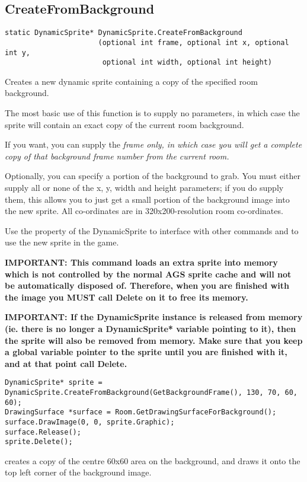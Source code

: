 \subsection{CreateFromBackground}\label{DynamicSprite.CreateFromBackground}%

\begin{verbatim}
static DynamicSprite* DynamicSprite.CreateFromBackground
                      (optional int frame, optional int x, optional int y,
                       optional int width, optional int height)
\end{verbatim}
Creates a new dynamic sprite containing a copy of the specified room background.

The most basic use of this function is to supply no parameters, in which case
the sprite will contain an exact copy of the current room background.

If you want, you can supply the \it{frame} only, in which case you will get a
complete copy of that background frame number from the current room.

Optionally, you can specify a portion of the background to grab. You must
either supply all or none of the x, y, width and height parameters; if you
do supply them, this allows you to just get a small portion of the background
image into the new sprite. All co-ordinates are in 320x200-resolution room co-ordinates.

Use the  property of the DynamicSprite to
interface with other commands and to use the new sprite in the game.

\bf{IMPORTANT:} This command loads an extra sprite into memory which is not controlled
by the normal AGS sprite cache and will not be automatically disposed of. Therefore, when
you are finished with the image you \bf{MUST} call Delete on it to free its memory.

\bf{IMPORTANT:} If the DynamicSprite instance is released from memory (ie. there is
no longer a DynamicSprite* variable pointing to it), then the sprite will also be
removed from memory. Make sure that you keep a global variable pointer to the sprite
until you are finished with it, and at that point call Delete.

\begin{verbatim}
DynamicSprite* sprite = DynamicSprite.CreateFromBackground(GetBackgroundFrame(), 130, 70, 60, 60);
DrawingSurface *surface = Room.GetDrawingSurfaceForBackground();
surface.DrawImage(0, 0, sprite.Graphic);
surface.Release();
sprite.Delete();
\end{verbatim}
creates a copy of the centre 60x60 area on the background, and draws it onto the
top left corner of the background image.

